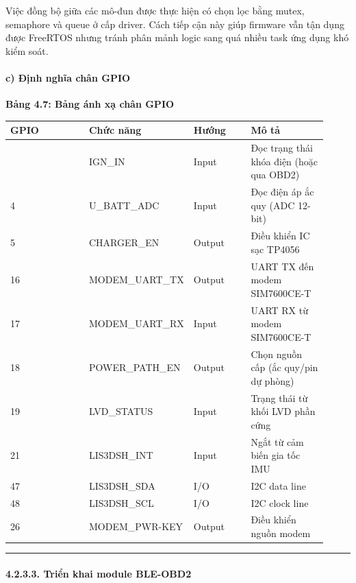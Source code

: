 \documentclass[13pt,a4paper]{extarticle}
\newcounter{none} %
\newcommand{\thesislongtableorignewline}{}
\let\thesislongtableorignewline\\
\renewcommand{\\}{\thesislongtableorignewline\hline}%
\let\\\thesislongtableorignewline
\newcommand{\thesistabletitle}[1]{%
  \begin{center}\textbf{#1}\end{center}%
}
\begin{document}
Việc đồng bộ giữa các mô-đun được thực hiện có chọn lọc bằng mutex,
semaphore và queue ở cấp driver. Cách tiếp cận này giúp firmware vẫn tận
dụng được FreeRTOS nhưng tránh phân mảnh logic sang quá nhiều task ứng
dụng khó kiểm soát.

\paragraph{c) Định nghĩa chân
GPIO}\label{c-ux111ux1ecbnh-nghux129a-chuxe2n-gpio}

\thesistabletitle{Bảng 4.7: Bảng ánh xạ chân GPIO}

{\def\LTcaptype{none} %
\begin{longtable}{|p{0.30\linewidth}|p{0.16\linewidth}|p{0.20\linewidth}|p{0.26\linewidth}|}
\hline \textbf{GPIO} & \textbf{Chức năng} & \textbf{Hướng} & \textbf{Mô tả} \\
\hline
\endhead
\hline
\endlastfoot
2 & IGN\_IN & Input & Đọc trạng thái khóa điện (hoặc qua OBD2) \\
4 & U\_BATT\_ADC & Input & Đọc điện áp ắc quy (ADC 12-bit) \\
5 & CHARGER\_EN & Output & Điều khiển IC sạc TP4056 \\
16 & MODEM\_UART\_TX & Output & UART TX đến modem SIM7600CE-T \\
17 & MODEM\_UART\_RX & Input & UART RX từ modem SIM7600CE-T \\
18 & POWER\_PATH\_EN & Output & Chọn nguồn cấp (ắc quy/pin dự phòng) \\
19 & LVD\_STATUS & Input & Trạng thái từ khối LVD phần cứng \\
21 & LIS3DSH\_INT & Input & Ngắt từ cảm biến gia tốc IMU \\
47 & LIS3DSH\_SDA & I/O & I2C data line \\
48 & LIS3DSH\_SCL & I/O & I2C clock line \\
26 & MODEM\_PWR-KEY & Output & Điều khiển nguồn modem \\
\end{longtable}
}

\begin{center}\rule{0.5\linewidth}{0.5pt}\end{center}

\paragraph{4.2.3.3. Triển khai module
BLE-OBD2}\label{4233-triux1ec3n-khai-module-ble-obd2}
\end{document}
